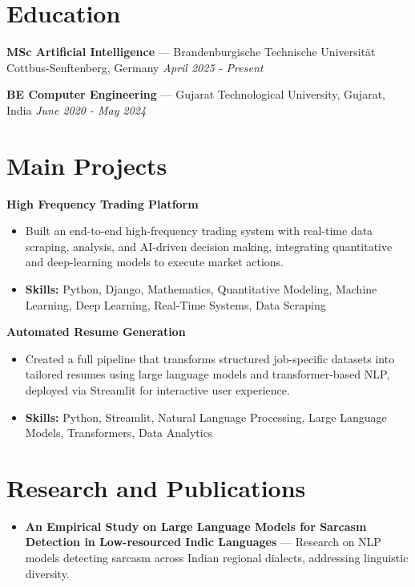 \documentclass[a4paper,10pt]{article}
\begin{document}
\section*{Education}
\textbf{MSc Artificial Intelligence} — Brandenburgische Technische Universität Cottbus-Senftenberg, Germany \hfill \textit{April 2025 - Present}\par
\vspace{1.5pt}
\textbf{BE Computer Engineering} — Gujarat Technological University, Gujarat, India \hfill \textit{June 2020 - May 2024}\par

\section*{Main Projects}
\textbf{High Frequency Trading Platform}\par
\vspace{1pt}
\begin{itemize}
  \item Built an end-to-end high-frequency trading system with real-time data scraping, analysis, and AI-driven decision making, integrating quantitative and deep-learning models to execute market actions.
  \item \textbf{Skills:} Python, Django, Mathematics, Quantitative Modeling, Machine Learning, Deep Learning, Real-Time Systems, Data Scraping
\end{itemize}
\vspace{3pt}
\textbf{Automated Resume Generation}\par
\vspace{1pt}
\begin{itemize}
  \item Created a full pipeline that transforms structured job-specific datasets into tailored resumes using large language models and transformer-based NLP, deployed via Streamlit for interactive user experience.
  \item \textbf{Skills:} Python, Streamlit, Natural Language Processing, Large Language Models, Transformers, Data Analytics
\end{itemize}

\section*{Research and Publications}
\begin{itemize}
\item \textbf{An Empirical Study on Large Language Models for Sarcasm Detection in Low-resourced Indic Languages} — Research on NLP models detecting sarcasm across Indian regional dialects, addressing linguistic diversity.
\end{itemize}
\end{document}
